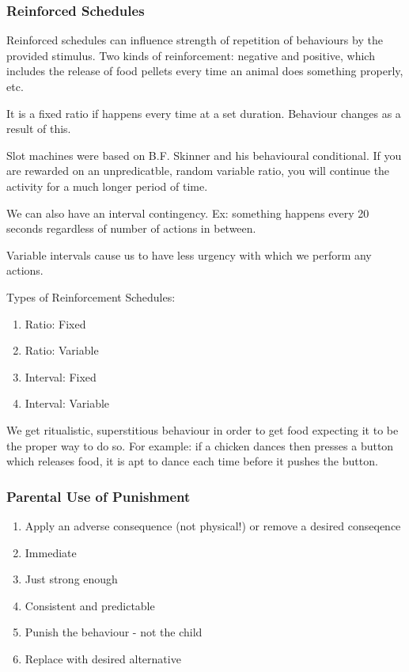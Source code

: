 \documentclass[12pt]{article}
\begin{document}
\subsubsection*{Reinforced Schedules}
Reinforced schedules can influence strength of repetition of behaviours by the provided stimulus. Two kinds of reinforcement: negative and positive, which includes the release of food pellets every time an animal does something properly, etc.

It is a fixed ratio if happens every time at a set duration. Behaviour changes as a result of this.

Slot machines were based on B.F. Skinner and his behavioural conditional. If you are rewarded on an unpredicatble, random variable ratio, you will continue the activity for a much longer period of time.

We can also have an interval contingency. Ex: something happens every 20 seconds regardless of number of actions in between.

Variable intervals cause us to have less urgency with which we perform any actions.

Types of Reinforcement Schedules:
\begin{enumerate}
\item Ratio: Fixed
\item Ratio: Variable
\item Interval: Fixed
\item Interval: Variable
\end{enumerate}

We get ritualistic, superstitious behaviour in order to get food expecting it to be the proper way to do so. For example: if a chicken dances then presses a button which releases food, it is apt to dance each time before it pushes the button.

\subsubsection*{Parental Use of Punishment}
\begin{enumerate}
\item Apply an adverse consequence (not physical!) or remove a desired conseqence
\item Immediate
\item Just strong enough
\item Consistent and predictable
\item Punish the behaviour - not the child
\item Replace with desired alternative
\end{enumerate}
\end{document}

